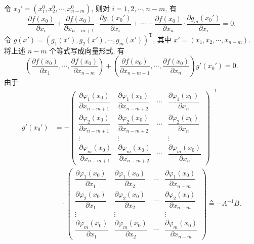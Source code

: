 \documentclass[UTF8,12pt,a4paper,fontset=fandol]{ctexart}
\begin{document}
令 $x_0'=(x_1^0,x_2^0,\cdots,x_{n-m}^0)$, 则对 $i=1,2,\cdots,n-m$, 有
\[
  \frac{\partial f(x_0)}{\partial x_i}
  +\frac{\partial f(x_0)}{\partial x_{n-m+1}}\cdot
  \frac{\partial g_1(x_0')}{\partial x_i}
  +\cdots+
  \frac{\partial f(x_0)}{\partial x_n}\cdot
  \frac{\partial g_m(x_0')}{\partial x_i}
  =0.
\]
令 $g(x')=(g_1(x'),g_2(x'),\cdots,g_m(x'))^{\mathrm T}$, 其中 $x'=(x_1,x_2,\cdots,x_{n-m})$. 将上述 $n-m$ 个等式写成向量形式, 有
\begin{equation}
  \left(
    \frac{\partial f(x_0)}{\partial x_1},
    \cdots,
    \frac{\partial f(x_0)}{\partial x_{n-m}}
  \right)
  +
  \left(
    \frac{\partial f(x_0)}{\partial x_{n-m+1}},
    \cdots,
    \frac{\partial f(x_0)}{\partial x_n}
  \right)
  g'(x_0')=0.
  \tag{14.5.4}
\end{equation}
由于
\begin{equation}
\begin{aligned}
  g'(x_0')
  &=
  -
  \begin{pmatrix}
    \dfrac{\partial\varphi_1(x_0)}{\partial x_{n-m+1}} &
    \dfrac{\partial\varphi_1(x_0)}{\partial x_{n-m+2}} &
    \cdots &
    \dfrac{\partial\varphi_1(x_0)}{\partial x_n}\\
    \dfrac{\partial\varphi_2(x_0)}{\partial x_{n-m+1}} &
    \dfrac{\partial\varphi_2(x_0)}{\partial x_{n-m+2}} &
    \cdots &
    \dfrac{\partial\varphi_2(x_0)}{\partial x_n}\\
    \vdots & \vdots & & \vdots\\
    \dfrac{\partial\varphi_m(x_0)}{\partial x_{n-m+1}} &
    \dfrac{\partial\varphi_m(x_0)}{\partial x_{n-m+2}} &
    \cdots &
    \dfrac{\partial\varphi_m(x_0)}{\partial x_n}
  \end{pmatrix}^{-1}\\
  &\quad\cdot
  \begin{pmatrix}
    \dfrac{\partial\varphi_1(x_0)}{\partial x_1} &
    \dfrac{\partial\varphi_1(x_0)}{\partial x_2} &
    \cdots &
    \dfrac{\partial\varphi_1(x_0)}{\partial x_{n-m}}\\
    \dfrac{\partial\varphi_2(x_0)}{\partial x_1} &
    \dfrac{\partial\varphi_2(x_0)}{\partial x_2} &
    \cdots &
    \dfrac{\partial\varphi_2(x_0)}{\partial x_{n-m}}\\
    \vdots & \vdots & & \vdots\\
    \dfrac{\partial\varphi_m(x_0)}{\partial x_1} &
    \dfrac{\partial\varphi_m(x_0)}{\partial x_2} &
    \cdots &
    \dfrac{\partial\varphi_m(x_0)}{\partial x_{n-m}}
  \end{pmatrix}
  \triangleq -A^{-1}B.
\end{aligned}
\tag{14.5.5}
\end{equation}
\end{document}
